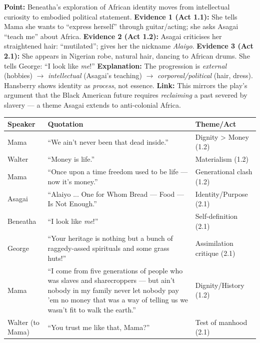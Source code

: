 \documentclass[11pt]{article}
\newcounter{popsec}
\newcounter{popsub}
\newcommand{\courssub}[1]{%
  \stepcounter{popsub}%
  \par\vspace{9pt}\noindent{\popxbold\fontsize{11.5}{13}\selectfont\color{popink}{\color{poporange}\thepopsec.\thepopsub}\hspace{6pt}#1}\par\nopagebreak\vspace{4pt}
}
\begin{document}
\begin{exoresolu}
\textbf{Point:} Beneatha's exploration of African identity moves from intellectual curiosity to embodied political statement.
\textbf{Evidence 1 (Act 1.1):} She tells Mama she wants to ``express herself'' through guitar/acting; she asks Asagai ``teach me'' about Africa.
\textbf{Evidence 2 (Act 1.2):} Asagai criticises her straightened hair: ``mutilated''; gives her the nickname \emph{Alaiyo}.
\textbf{Evidence 3 (Act 2.1):} She appears in Nigerian robe, natural hair, dancing to African drums. She tells George: ``I look like \emph{me}!''
\textbf{Explanation:} The progression is \emph{external} (hobbies) $\to$ \emph{intellectual} (Asagai's teaching) $\to$ \emph{corporeal/political} (hair, dress). Hansberry shows identity as \emph{process}, not essence.
\textbf{Link:} This mirrors the play's argument that the Black American future requires \emph{reclaiming} a past severed by slavery — a theme Asagai extends to anti-colonial Africa.
\end{exoresolu}

\courssub{Key Quotations for Examination}

\begin{center}
\begin{tabularx}{\linewidth}{|l|X|l|}
\hline
\rowcolor{popblueL}
\textbf{Speaker} & \textbf{Quotation} & \textbf{Theme/Act} \\
\hline
Mama & ``We ain't never been that dead inside.'' & Dignity > Money (1.2) \\
\hline
Walter & ``Money is life.'' & Materialism (1.2) \\
\hline
Mama & ``Once upon a time freedom used to be life — now it's money.'' & Generational clash (1.2) \\
\hline
Asagai & ``Alaiyo ... One for Whom Bread — Food — Is Not Enough.'' & Identity/Purpose (2.1) \\
\hline
Beneatha & ``I look like \emph{me}!'' & Self-definition (2.1) \\
\hline
George & ``Your heritage is nothing but a bunch of raggedy-assed spirituals and some grass huts!'' & Assimilation critique (2.1) \\
\hline
Mama & ``I come from five generations of people who was slaves and sharecroppers — but ain't nobody in my family never let nobody pay 'em no money that was a way of telling us we wasn't fit to walk the earth.'' & Dignity/History (1.2) \\
\hline
Walter (to Mama) & ``You trust me like that, Mama?'' & Test of manhood (2.1) \\
\hline
\end{tabularx}
\end{center}
\end{document}

